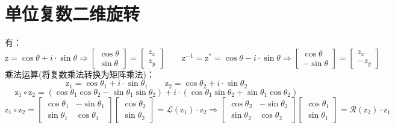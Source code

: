 \documentclass[12pt, onecolumn]{article}
\newcommand\normf{\fangsong}
\newcommand\bsm[1]{\boldsymbol{\mathrm{#1}}}
\begin{document}
	\section{\normf 单位复数二维旋转}
	有：
	\begin{equation}
	\bsm{z}=\cos\theta+i\cdot\sin\theta\Rightarrow\begin{bmatrix}
	\cos\theta\\\sin\theta
	\end{bmatrix}=\begin{bmatrix}
			z_x\\z_y
			\end{bmatrix}
	\qquad
	\bsm{z}^{-1}=\bsm{z}^*=\cos\theta-i\cdot\sin\theta\Rightarrow\begin{bmatrix}
		\cos\theta\\-\sin\theta
		\end{bmatrix}=\begin{bmatrix}
					z_x\\-z_y
					\end{bmatrix}
	\end{equation}
	乘法运算(将复数乘法转换为矩阵乘法)：
	\begin{equation}
	\bsm{z}_1=\cos\theta_1+i\cdot\sin\theta_1
	\qquad
	\bsm{z}_2=\cos\theta_2+i\cdot\sin\theta_2
	\end{equation}
	\begin{equation}
	\bsm{z}_1\circ\bsm{z}_2=\left(\cos\theta_1\cos\theta_2-\sin\theta_1\sin\theta_2
	\right)+i\cdot \left(\cos\theta_1\sin\theta_2+\sin\theta_1\cos\theta_2 \right) 
	\end{equation}
	\begin{equation}
	\bsm{z}_1\circ\bsm{z}_2=\begin{bmatrix}
	\cos\theta_1&-\sin\theta_1\\
	\sin\theta_1&\cos\theta_1
	\end{bmatrix}\begin{bmatrix}
	\cos\theta_2\\\sin\theta_2
	\end{bmatrix}=\mathcal{L}(\bsm{z}_1)\cdot\bsm{z}_2
	\Rightarrow\begin{bmatrix}
		\cos\theta_2&-\sin\theta_2\\
		\sin\theta_2&\cos\theta_2
		\end{bmatrix}\begin{bmatrix}
		\cos\theta_1\\\sin\theta_1
		\end{bmatrix}=\mathcal{R}(\bsm{z}_2)\cdot\bsm{z}_1
	\end{equation}
\end{document}
